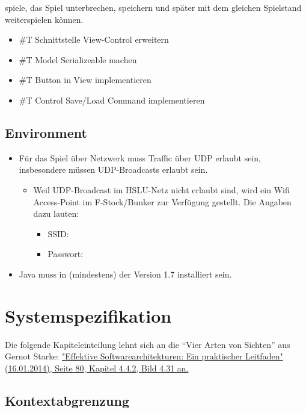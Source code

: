\documentclass[a4paper, 10pt, fleqn]{article}
\begin{document}
\begin{itemize}
\begin{itemize}
            spiele, das Spiel unterbrechen, speichern und später mit dem 
            gleichen Spielstand weiterspielen können.
        \begin{itemize}
            \item \#T Schnittstelle View-Control erweitern
            \item \#T Model Serializeable machen
            \item \#T Button in View implementieren
            \item \#T Control Save/Load Command implementieren
        \end{itemize}
    \end{itemize}
\end{itemize}

\subsection{Environment}
\begin{itemize}
    \item Für das Spiel über Netzwerk muss Traffic über UDP erlaubt sein, 
        insbesondere müssen UDP-Broadcasts erlaubt sein.
    \begin{itemize}
        \item Weil UDP-Broadcast im HSLU-Netz nicht erlaubt sind, wird ein 
            Wifi Access-Point im F-Stock/Bunker zur Verfügung gestellt. Die 
            Angaben dazu lauten:
        \begin{itemize}
            \item SSID: 
            \item Passwort: 
        \end{itemize}
    \end{itemize}
    \item Java muss in (mindestens) der Version 1.7 installiert sein.
\end{itemize}

\section{Systemspezifikation}
Die folgende Kapiteleinteilung lehnt sich an die “Vier Arten von Sichten” 
aus Gernot Starke: \href{http://books.google.ch/books?id=CaqQAgAAQBAJ&pg=PA80}
{"Effektive Softwarearchitekturen: Ein praktischer Leitfaden" (16.01.2014), 
Seite 80, Kapitel 4.4.2, Bild 4.31 an.}

\subsection{Kontextabgrenzung}
\end{document}
